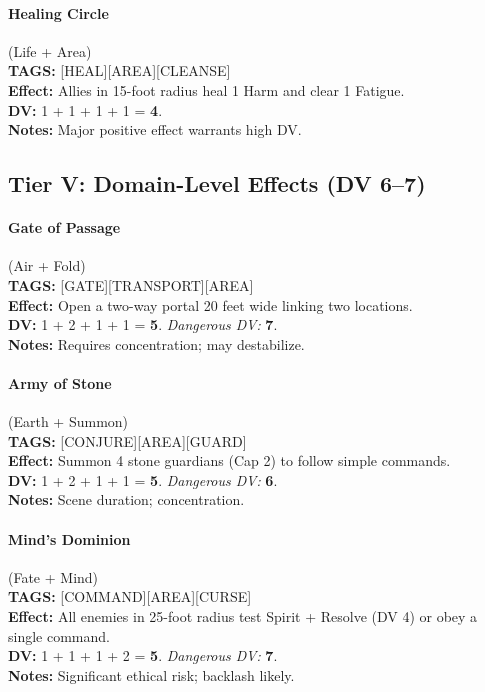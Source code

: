 \paragraph{Healing Circle} (Life + Area) \\
\textbf{TAGS:} {[HEAL][AREA][CLEANSE]} \\
\textbf{Effect:} Allies in 15-foot radius heal 1 Harm and clear 1 Fatigue. \\
\textbf{DV:} 1 + 1 + 1 + 1 = \textbf{4}. \\
\textbf{Notes:} Major positive effect warrants high DV.

\subsection{Tier V: Domain-Level Effects (DV 6--7)}

\paragraph{Gate of Passage} (Air + Fold) \\
\textbf{TAGS:} {[GATE][TRANSPORT][AREA]} \\
\textbf{Effect:} Open a two-way portal 20 feet wide linking two locations. \\
\textbf{DV:} 1 + 2 + 1 + 1 = \textbf{5}. \emph{Dangerous DV:} \textbf{7}. \\
\textbf{Notes:} Requires concentration; may destabilize.

\paragraph{Army of Stone} (Earth + Summon) \\
\textbf{TAGS:} {[CONJURE][AREA][GUARD]} \\
\textbf{Effect:} Summon 4 stone guardians (Cap 2) to follow simple commands. \\
\textbf{DV:} 1 + 2 + 1 + 1 = \textbf{5}. \emph{Dangerous DV:} \textbf{6}. \\
\textbf{Notes:} Scene duration; concentration.

\paragraph{Mind's Dominion} (Fate + Mind) \\
\textbf{TAGS:} {[COMMAND][AREA][CURSE]} \\
\textbf{Effect:} All enemies in 25-foot radius test Spirit + Resolve (DV 4) or obey a single command. \\
\textbf{DV:} 1 + 1 + 1 + 2 = \textbf{5}. \emph{Dangerous DV:} \textbf{7}. \\
\textbf{Notes:} Significant ethical risk; backlash likely.

